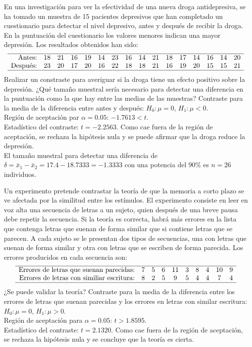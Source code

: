 {En una investigación para ver la efectividad de una nueva droga antidepresiva, se ha tomado un muestra de 15
pacientes depresivos que han completado un cuestionario para detectar el nivel depresivo, antes y después de recibir
la droga.
En la puntuación del cuestionario los valores menores indican una mayor depresión.
Los resultados obtenidos han sido:
\[
\begin{array}{rccccccccccccccc}
\hline
\mbox{Antes:}  & 18 & 21 & 16 & 19 & 14 & 23 & 16 & 14 & 21 & 18 & 17 & 14 & 16 & 14 & 20 \\
\mbox{Después:}& 23 & 20 & 17 & 20 & 16 & 22 & 18 & 18 & 21 & 16 & 19 & 20 & 15 & 15 & 21 \\
\hline 
\end{array}
\]
Realizar un constraste para averiguar si la droga tiene un efecto positivo sobre la depresión.
¿Qué tamaño muestral sería necesario para detectar una diferencia en la puntuación como la que hay entre las medias de las muestras?
}
{
Contraste para la media de la diferencia entre antes y después: $H_0:\mu=0$, $H_1:\mu<0$.\\
Región de aceptación par $\alpha=0.05$: $-1.7613<t$.\\
Estadístico del contraste: $t=-2.2563$. Como cae fuera de la región de aceptación, se rechaza la hipótesis nula y
se puede afirmar que la droga reduce la depresión.\\
El tamaño muestral para detectar una diferencia de $\delta=\bar x_1-\bar x_2 = 17.4-18.7333=-1.3333$ con una potencia
del 90\% es $n=26$ individuos.
}
{}


{Un experimento pretende contrastar la teoría de que la memoria a corto plazo se ve afectada por la similitud entre los
estímulos. El experimento consiste en leer en voz alta una secuencia de letras a un sujeto, quien después de una breve
pausa debe repetir la secuencia.
Si la teoría es correcta, habrá más errores en la lista que contenga letras que suenan de forma similar que si
contiene letras que se parecen.
A cada sujeto se le presentan dos tipos de secuencias, una con letras que suenan de forma similar y otra con letras
que se escriben de forma parecida.
Los errores producidos en cada secuencia son:
\[
\begin{array}{rccccccccc}
\hline
\mbox{Errores de letras que suenan parecidas:}  & 7 & 5 & 6 & 11 & 3 & 8 & 4 & 10 & 9\\
\mbox{Errores de letras con similiar escritura:}& 8 & 2 & 5 &  9 & 5 & 4 & 4 &  7 & 4\\
\hline 
\end{array} 
\]
¿Se puede validar la teoría?
}
{
Contraste para la media de la diferencia entre los errores de letras que suenan parecidas y los errores en letras con
similar escritura: $H_0:\mu=0$, $H_1:\mu>0$.\\
Región de aceptación para $\alpha=0.05$: $t>1.8595$.\\
Estadístico del contraste: $t=2.1320$. Como cae fuera de la región de aceptación, se rechaza la hipótesis nula y
se concluye que la teoría es cierta.
}
{}


